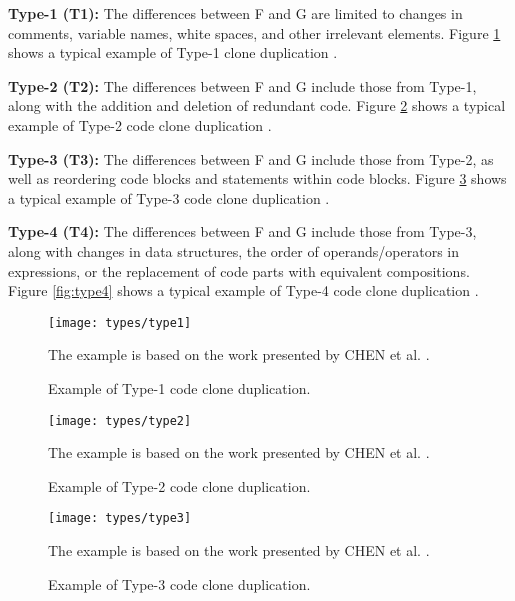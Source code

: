 \begin{itemize}
    \begin{item}
	\textbf{Type-1 (T1):} The differences between F and G are limited to
	    changes in comments, variable names, white spaces, and other
	    irrelevant elements. Figure \ref{fig:type1} shows a typical example
	    of Type-1 clone duplication \citep{litreview}.
    \end{item}
    \begin{item}
	\textbf{Type-2 (T2):} The differences between F and G include those
	    from Type-1, along with the addition and deletion of redundant
	    code. Figure \ref{fig:type2} shows a typical example of Type-2 code
	    clone duplication \citep{litreview}.
    \end{item}
    \begin{item}
	\textbf{Type-3 (T3):} The differences between F and G include those
	    from Type-2, as well as reordering code blocks and statements
	    within code blocks. Figure \ref{fig:type3} shows a typical example
	    of Type-3 code clone duplication \citep{litreview}.
    \end{item}
    \begin{item}
	\textbf{Type-4 (T4):} The differences between F and G include those
	    from Type-3, along with changes in data structures, the order of
	    operands/operators in expressions, or the replacement of code parts
	    with equivalent compositions. Figure \ref{fig:type4} shows a
	    typical example of Type-4 code clone duplication \citep{litreview}.
    \end{item}
\end{itemize}

\begin{figure}
\texttt{[image: types/type1]}
\caption{Example of Type-1 code clone duplication.}
The example is based on the work presented by CHEN et al. \citep{litreview}.
\label{fig:type1}
\end{figure}

\begin{figure}
\texttt{[image: types/type2]}
\caption{Example of Type-2 code clone duplication.}
The example is based on the work presented by CHEN et al. \citep{litreview}.
\label{fig:type2}
\end{figure}

\begin{figure}
\texttt{[image: types/type3]}
\caption{Example of Type-3 code clone duplication.}
The example is based on the work presented by CHEN et al. \citep{litreview}.
\label{fig:type3}
\end{figure}

